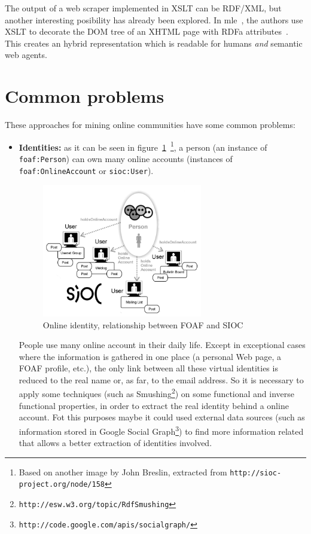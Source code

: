 \documentclass{../templates/www2008-submission}
\begin{document}
The output of a web scraper implemented in XSLT can be RDF/XML, but
another interesting posibility has already been explored. In
mle~\cite{Hausenblas2007}, the authors use XSLT to decorate the
DOM tree of an XHTML page with RDFa attributes~\cite{Birbeck2006}.
This creates an hybrid representation which is readable for
humans \emph{and} semantic web agents.


\section{\label{sec:problems}Common problems}

These approaches for mining online communities have some common problems:

\begin{itemize}
  \item \textbf{Identities:} as it can be seen in figure~\ref{fig:foaf-sioc}~\footnote{Based 
	on another image by John Breslin, extracted from \texttt{http://sioc-project.org/node/158}},
	a person (an instance of \texttt{foaf:Person}) can own many online 
	accounts (instances of \texttt{foaf:OnlineAccount} or \texttt{sioc:User}). 

	\begin{figure}[ht]
	 \centering
	 \includegraphics[width=7cm]{images/foaf-sioc.png}
	 \caption{\label{fig:foaf-sioc}Online identity, relationship between FOAF and SIOC}
	\end{figure}

	People use many online account in their daily life. Except in exceptional 
	cases where the information is gathered in one place (a personal Web page,
	a FOAF profile, etc.), the only link between all these virtual identities 
	is reduced to the real name or, as far, to the email address. So it is 
	necessary to apply some techniques (such as 
	Smushing\footnote{\texttt{http://esw.w3.org/topic/RdfSmushing}})
	on some functional and inverse functional properties, in order to extract 
	the real identity behind a online account. Fot this purposes maybe it could 
	used external data sources (such as information stored in Google Social 
	Graph\footnote{\texttt{http://code.google.com/apis/socialgraph/}})
	to find more information related that allows a better extraction of
	identities involved.


\end{itemize}
\end{document}
